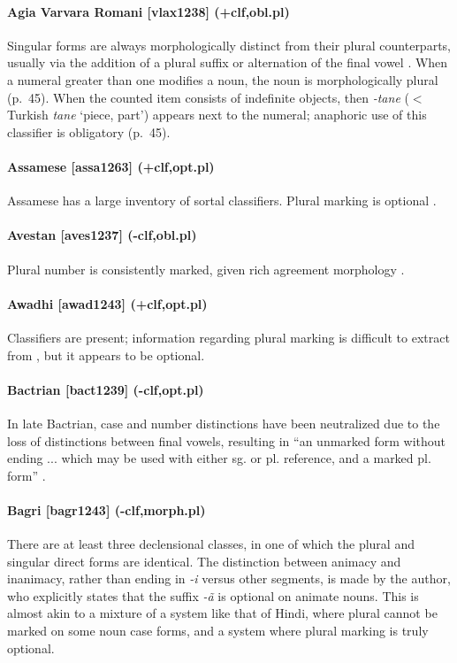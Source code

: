 \paragraph{Agia Varvara Romani [vlax1238] (+clf,obl.pl)}
Singular forms are always morphologically distinct from their plural counterparts, usually via the addition of a plural suffix or alternation of the final vowel \citep[23ff.]{Igla1996}. When a numeral greater than one modifies a noun, the noun is morphologically plural (p.\ 45). When the counted item consists of indefinite objects, then {\it -tane} ($<$ Turkish {\it tane} `piece, part') appears next to the numeral; anaphoric use of this classifier is obligatory (p.\ 45). 
\paragraph{Assamese [assa1263] (+clf,opt.pl)}
Assamese has a large inventory of sortal classifiers. Plural marking is optional \citep{Borah2012,Chowdhary2012}.
\paragraph{Avestan [aves1237] (-clf,obl.pl)}
Plural number is consistently marked, given rich agreement morphology \citep{HoffmannForssman2002}.
\paragraph{Awadhi [awad1243] (+clf,opt.pl)}
Classifiers are present; information regarding plural marking is difficult to extract from \citealt[115ff.]{Saksena1971}, but it appears to be optional.
\paragraph{Bactrian [bact1239] (-clf,opt.pl)}
In late Bactrian, case and number distinctions have been neutralized due to the loss of distinctions between final vowels, resulting in ``an unmarked form without ending ... which may be used with either sg. or pl. reference, and a marked pl. form'' \citep[40]{SimsWilliams2007}.
\paragraph{Bagri [bagr1243] (-clf,morph.pl)}
There are at least three declensional classes, in one of which the plural and singular direct forms are identical. The distinction between animacy and inanimacy, rather than ending in {\it -i} versus other segments, is made by the author, who explicitly states that the suffix {\it -\~{a}} is optional on animate nouns. This is almost akin to a mixture of a system like that of Hindi, where plural cannot be marked on some noun case forms, and a system where plural marking is truly optional.
